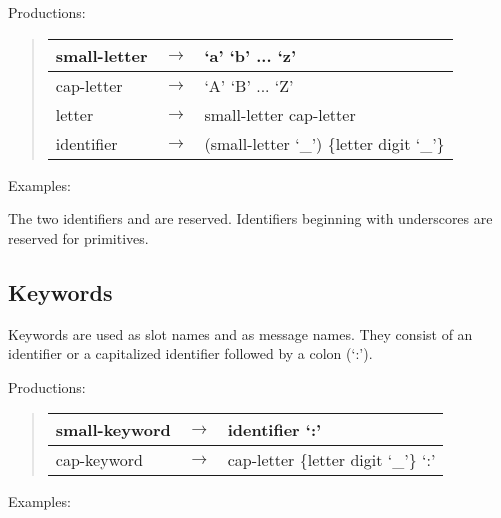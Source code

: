 \documentclass[letterpaper,10pt,english]{sphinxmanual}
\begin{document}
Productions:
\begin{quote}

\noindent\begin{tabulary}{\linewidth}{|L|L|L|}
\hline

small-letter
&
\(\rightarrow\)
&
‘a’ \textbar{} ‘b’ \textbar{} ... \textbar{} ‘z’
\\
\hline
cap-letter
&
\(\rightarrow\)
&
‘A’ \textbar{} ‘B’ \textbar{} ... \textbar{} ‘Z’
\\
\hline
letter
&
\(\rightarrow\)
&
small-letter \textbar{} cap-letter
\\
\hline
identifier
&
\(\rightarrow\)
&
(small-letter \textbar{} ‘\_’) \{letter \textbar{} digit \textbar{} ‘\_’\}
\\
\hline\end{tabulary}

\end{quote}

Examples:
\begin{quote}

\end{quote}

The two identifiers  and  are reserved. Identifiers beginning with underscores are reserved for primitives.


\subsection{Keywords}
\label{\detokenize{langref:keywords}}\label{\detokenize{langref:pp-keywords}}\label{\detokenize{langref:index-61}}
Keywords are used as slot names and as message names. They consist of an identifier or a capitalized identifier followed by a colon (‘:’).

Productions:
\begin{quote}

\noindent\begin{tabulary}{\linewidth}{|L|L|L|}
\hline

small-keyword
&
\(\rightarrow\)
&
identifier ‘:’
\\
\hline
cap-keyword
&
\(\rightarrow\)
&
cap-letter \{letter \textbar{} digit \textbar{} ‘\_’\} ‘:’
\\
\hline\end{tabulary}

\end{quote}

Examples:
\begin{quote}

\end{quote}
\end{document}
